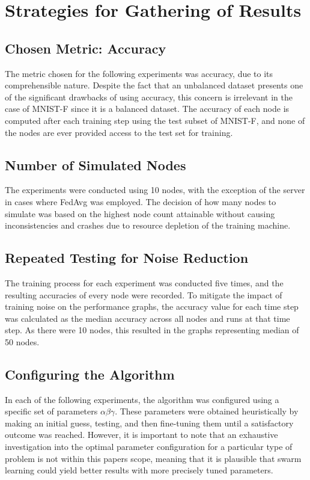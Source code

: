 \section{Strategies for Gathering of Results}
\subsection{Chosen Metric: Accuracy}
The metric chosen for the following experiments was accuracy, due to its comprehensible nature. Despite the fact that an unbalanced dataset presents one of the significant drawbacks of using accuracy, this concern is irrelevant in the case of MNIST-F since it is a balanced dataset. The accuracy of each node is computed after each training step using the test subset of MNIST-F, and none of the nodes are ever provided access to the test set for training.

\subsection{Number of Simulated Nodes}
The experiments were conducted using 10 nodes, with the exception of the server in cases where FedAvg was employed. The decision of how many nodes to simulate was based on the highest node count attainable without causing inconsistencies and crashes due to resource depletion of the training machine.

\subsection{Repeated Testing for Noise Reduction}
The training process for each experiment was conducted five times, and the resulting accuracies of every node were recorded. To mitigate the impact of training noise on the performance graphs, the accuracy value for each time step was calculated as the median accuracy across all nodes and runs at that time step. As there were 10 nodes, this resulted in the graphs representing median of 50 nodes.

\subsection{Configuring the Algorithm}
In each of the following experiments, the algorithm was configured using a specific set of parameters $\alpha \beta \gamma$. These parameters were obtained heuristically by making an initial guess, testing, and then fine-tuning them until a satisfactory outcome was reached. However, it is important to note that an exhaustive investigation into the optimal parameter configuration for a particular type of problem is not within this papers scope, meaning that it is plausible that swarm learning could yield better results with more precisely tuned parameters.

